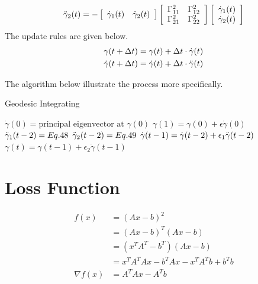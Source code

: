 \documentclass{article}
\theoremstyle{definition}
\theoremstyle{plain}
\begin{document}
\begin{equation}
    \Ddot{\gamma}_2(t)=-\left[\begin{array}{cc}\Dot{\gamma}_1(t) & \Dot{\gamma}_2(t)\end{array}\right]
    \left[\begin{array}{cc}
        \Gamma^2_{11} & \Gamma^2_{12} \\
        \Gamma^2_{21} & \Gamma^2_{22}
    \end{array}\right]
    \left[\begin{array}{c}
         \Dot{\gamma}_1(t) \\
         \Dot{\gamma}_2(t)
    \end{array}\right]
\end{equation}
The update rules are given below.
\begin{align}
    \gamma(t+\Delta t)&=\gamma(t)+\Delta t\cdot\Dot{\gamma}(t)\\ \nonumber
    \Dot{\gamma}(t+\Delta t)&=\Dot{\gamma}(t)+\Delta t\cdot\Ddot{\gamma}(t)
\end{align}

The algorithm below illustrate the process more specifically.
\begin{algorithm}  
\caption{Geodesic Integrating}\label{algo6}
    \begin{algorithmic}
        \State $\Dot{\gamma}(0)=\text{principal eigenvector at }\gamma(0)$
        \State $\gamma(1)=\gamma(0)+\epsilon\Dot{\gamma}(0)$
            \State $\Ddot{\gamma}_1(t-2)=Eq.48$
            \State $\Ddot{\gamma}_2(t-2)=Eq.49$
            \State $\Dot{\gamma}(t-1)=\Dot{\gamma}(t-2)+\epsilon_1\Ddot{\gamma}(t-2)$
            \State $\gamma(t)=\gamma(t-1)+\epsilon_2\Dot{\gamma}(t-1)$
        \EndFor
        \State \Return{$\gamma$}
    \end{algorithmic}  
\end{algorithm}  
\section{Loss Function}
\begin{align*}
    f(x)&=(Ax-b)^2\\
    &=(Ax-b)^T(Ax-b)\\
    &=(x^TA^T-b^T)(Ax-b)\\
    &=x^TA^TAx-b^TAx-x^TA^Tb+b^Tb\\
    \nabla f(x)&=A^TAx-A^Tb
\end{align*}
\renewcommand\refname{Reference}


\end{document}
